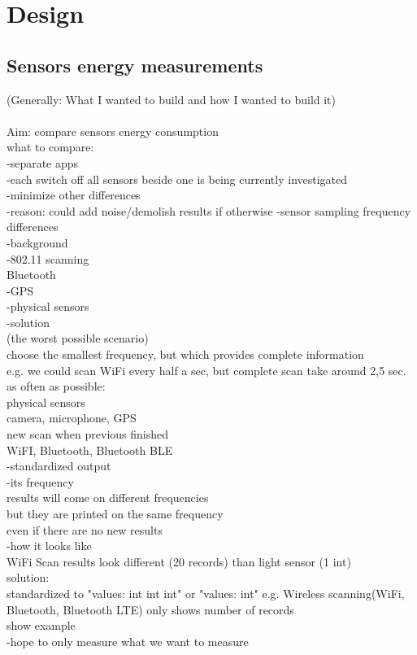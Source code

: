 \section{Design}
\label{s:design}
\subsection{Sensors energy measurements}

(Generally: What I wanted to build and how I wanted to build it)\\
\\
Aim: compare sensors energy consumption\\

what to compare:\\
	-separate apps\\
	-each switch off all sensors beside one is being currently investigated\\
	-minimize other differences \\
		-reason: could add noise/demolish results  if otherwise
		-sensor sampling frequency differences\\
			-background\\
				-802.11 scanning\\
					Bluetooth\\
				-GPS\\
				-physical sensors\\
			-solution\\
				(the worst possible scenario)\\
				choose the smallest frequency, but which provides complete information\\
					e.g. we could scan WiFi every half a sec, but complete scan take around 2,5 sec.\\
				as often as possible:\\
					physical sensors\\
					camera, microphone, GPS\\	
				new scan when previous finished\\
					WiFI, Bluetooth, Bluetooth BLE\\
		-standardized output\\
				-its frequency\\
					results will come on different frequencies\\
					but they are printed on the same frequency\\
						even if there are no new results\\
				-how it looks like\\
					WiFi Scan results look different (20 records) than light sensor (1 int)\\
					solution:\\
						standardized to "values: int int int" or "values: int"
							e.g. Wireless scanning(WiFi, Bluetooth, Bluetooth LTE) only shows number of records\\
							show example\\	
		-hope to only measure what we want to measure\\				
				
